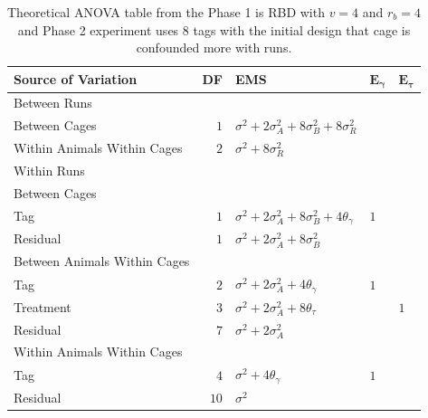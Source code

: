 \documentclass[12pt,a4paper]{article}
\begin{document}
\begin{table}[ht]
\centering
 \caption{Theoretical ANOVA table from the Phase 1 is RBD with $v = 4$ and $r_b = 4$ and Phase 2 experiment uses 8 tags with the initial design that cage is confounded more with runs.}
 \begin{tabular}[t]{lrlll} 
 \toprule 
 \multicolumn{1}{l}{\textbf{Source of Variation}} & \multicolumn{1}{l}{\textbf{DF}} & \multicolumn{1}{l}{\textbf{EMS}}& \multicolumn{1}{l}{$\bm{E_{\gamma}}$}&\multicolumn{1}{l}{$\bm{E_{\tau}}$}\\ 
 \midrule 
 Between Runs &  &  & & \\ 
 \quad Between Cages & $1$ & $\sigma^2+2\sigma_{A}^2+8\sigma_{B}^2+8\sigma_{R}^2$ & & \\  
 \quad Within Animals Within Cages & $2$ & $\sigma^2+8\sigma_{R}^2$ & & \\ \hline 
 Within Runs &  &  & & \\ 
 \quad Between Cages &  &  & & \\ 
 \quad \quad Tag & $1$ & $\sigma^2+2\sigma_{A}^2+8\sigma_{B}^2+4\theta_{\gamma}$ &$1$ & \\ 
 \quad \quad Residual & $1$ & $\sigma^2+2\sigma_{A}^2+8\sigma_{B}^2$ & & \\ \hline 
 \quad Between Animals Within Cages &  &  & & \\ 
 \quad \quad Tag & $2$ & $\sigma^2+2\sigma_{A}^2+4\theta_{\gamma}$ &$1$ & \\ 
 \quad \quad Treatment & $3$ & $\sigma^2+2\sigma_{A}^2+8\theta_{\tau}$ & & $1$\\ 
 \quad \quad Residual & $7$ & $\sigma^2+2\sigma_{A}^2$ & & \\ \hline 
 \quad Within Animals Within Cages &  &  & & \\ 
 \quad \quad Tag & $4$ & $\sigma^2+4\theta_{\gamma}$ &$1$ & \\ 
 \quad \quad Residual & $10$ & $\sigma^2$ & & \\ 
 \bottomrule 
 \end{tabular} 
 \label{tab:ANOVAPhase1RBD3} 
\end{table} 
\end{document}
